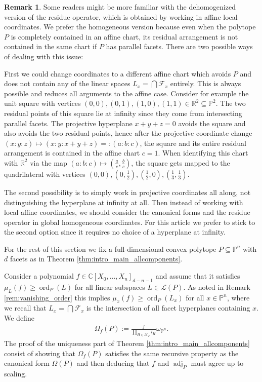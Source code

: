 \documentclass[a4paper,10pt]{amsart}
\theoremstyle{definition}
\newtheorem{remark}[defin]{Remark}
\theoremstyle{plain}
\newcommand{\ord}{\operatorname{ord}}
\newcommand{\adj}{\operatorname{adj}} %
\newcommand{\cF}{{\mathcal F}}
\newcommand{\cH}{{\mathcal H}}
\newcommand{\cL}{{\mathcal L}}
\newcommand{\C}{{\mathbb C}}
\newcommand{\R}{{\mathbb R}}
\newcommand{\pp}{\mathbb{P}}
\begin{document}
\begin{remark}
    Some readers might be more familiar with the dehomogenized version of the residue operator, which is obtained by working in affine local coordinates. We prefer the homogeneous version because even when the polytope $P$ is completely contained in an affine chart, its residual arrangement is not contained in the same chart if $P$ has parallel facets. There are two possible ways of dealing with this issue: 
    
    First we could change coordinates to a different affine chart which avoids $P$ and does not contain any of the linear spaces $L_x=\bigcap \cF_x$ entirely. This is always possible and reduces all arguments to the affine case. Consider for example the unit square with vertices $(0,0),(0,1),(1,0),(1,1)\in \R^2\subseteq \pp^2$. The two residual points of this square lie at infinity since they come from intersecting parallel facets. The projective hyperplane $x+y+z=0$ avoids the square and also avoids the two residual points, hence after the projective coordinate change $(x:y:z)\mapsto(x:y:x+y+z)=:(a:b:c)$, the square and its entire residual arrangement is contained in the affine chart $c=1$. When identifying this chart with $\R^2$ via the map $(a:b:c)\mapsto (\frac{a}{c},\frac{b}{c})$, the square gets mapped to the quadrilateral with vertices $(0,0),(0,\frac{1}{2}),(\frac{1}{2},0),(\frac{1}{3},\frac{1}{3})$. 

    The second possibility is to simply work in projective coordinates all along, not distinguishing the hyperplane at infinity at all. Then instead of working with local affine coordinates, we should consider the canonical forms and the residue operator in global homogeneous coordinates. For this article we prefer to stick to the second option since it requires no choice of a hyperplane at infinity.
\end{remark}

For the rest of this section we fix a full-dimensional convex polytope $P\subseteq \pp^n$ with $d$ facets as in Theorem \ref{thm:intro_main_allcomponents}.

Consider a polynomial $f\in \C[X_0,\ldots,X_n]_{d-n-1}$ and assume that it satisfies $\mu_L(f)\geq \ord_P(L)$ for all linear subspaces $L\in \cL(P)$. As noted in Remark \ref{rem:vanishing_order} this implies $\mu_x(f)\geq \ord_P(L_x)$ for all $x \in \pp^n$, where we recall that $L_x=\bigcap\cF_x$ is the intersection of all facet hyperplanes containing $x$. 
We define 
\begin{align*}
     \Omega_f(P):=\frac{f}{\prod_{H\in \cH_P}l_H}\omega_{\pp^n}.
 \end{align*}
 The proof of the uniqueness part of Theorem \ref{thm:intro_main_allcomponents} consist of showing that $\Omega_f(P)$ satisfies the same recursive property as the canonical form $\Omega(P)$ and then deducing that $f$ and $\adj_P$ must agree up to scaling.
\end{document}
